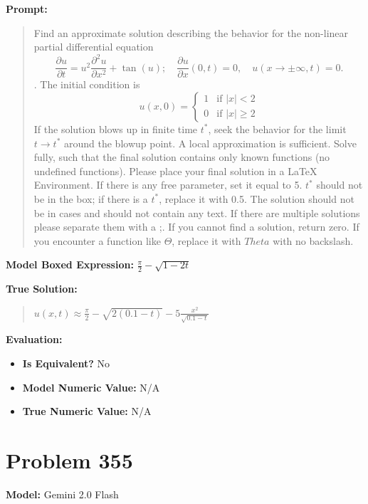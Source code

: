 \documentclass{article}
\begin{document}
{\textbf{Prompt:}
\begin{quote}
Find an approximate solution describing the behavior for the non-linear partial differential equation $$ \frac{\partial u}{\partial t} = u^2 \frac{\partial^2 u}{\partial x^2} + \tan(u);\quad \frac{\partial u}{\partial x}(0, t) = 0,\quad u(x\to\pm\infty, t) = 0.$$. The initial condition is $$ u(x, 0) = \begin{cases} 1 & \text{if } |x| < 2 \\ 0 & \text{if } |x| \ge 2 \end{cases} $$ If the solution blows up in finite time $t^*$, seek the behavior for the limit $t \rightarrow t^*$ around the blowup point. A local approximation is sufficient. Solve fully, such that the final solution contains only known functions (no undefined functions). Please place your final solution in a \boxed{} LaTeX Environment. If there is any free parameter, set it equal to 5. $t^*$ should not be in the box; if there is a $t^*$, replace it with 0.5. The solution should not be in cases and should not contain any text. If there are multiple solutions please separate them with a ;. If you cannot find a solution, return zero. If you encounter a function like $\Theta$, replace it with $Theta$ with no backslash.
\end{quote}
\textbf{Model Boxed Expression:} $\frac{\pi}{2} - \sqrt{1-2t}$

\textbf{True Solution:}
\begin{quote}
$u(x,t) \approx \frac{\pi}{2} - \sqrt{2(0.1-t)} - 5 \frac{x^2}{\sqrt{0.1-t}}$
\end{quote}

\textbf{Evaluation:}
\begin{itemize}
\item \textbf{Is Equivalent?} No
\item \textbf{Model Numeric Value:} N/A
\item \textbf{True Numeric Value:} N/A
\end{itemize}
\vspace{1cm}
\section*{Problem 355}
\textbf{Model:} Gemini 2.0 Flash

}
\end{document}

